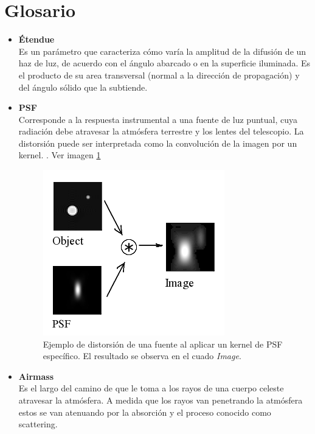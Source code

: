 \section*{Glosario}

\begin{itemize}
\item{\textbf{\'Etendue}}\\
\label{a1:etendue}
Es un par\'ametro que caracteriza c\'omo var\'ia la amplitud de la difusi\'on de un haz de luz, de acuerdo con el \'angulo abarcado o en la superficie iluminada. Es el producto de su area transversal (normal a la direcci\'on de propagaci\'on) y del \'angulo s\'olido que la subtiende.


\item{\textbf{PSF}}\\
\label{a1:psf}
Corresponde a la respuesta instrumental a una fuente de luz puntual, cuya radiaci\'on debe atravesar la atm\'osfera terrestre y los lentes del telescopio. La distorsi\'on puede ser interpretada como la convoluci\'on de la imagen por un kernel. \cite{huentelemu}. Ver imagen \ref{fig:a1}

\begin{figure}[h]
\centering
\includegraphics[scale=.5]{images/psf}
\caption{Ejemplo de distorsi\'on de una fuente al aplicar un kernel de PSF espec\'ifico. El resultado se observa en el cuado \textit{Image}.}
\label{fig:a1}
\end{figure}

\item{\textbf{Airmass}}\label{ap:airmass}\\
Es el largo del camino de que le toma a los rayos de una cuerpo celeste atravesar la atm\'osfera. A medida que los rayos van penetrando la atm\'osfera estos se van atenuando por la absorci\'on y el proceso conocido como scattering. 
\end{itemize}
\bigskip
